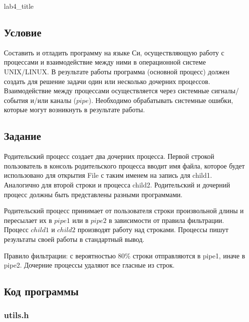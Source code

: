 \documentclass[12pt]{article}
\begin{document}
	
	{lab4_title}
	
	\subsection*{Условие}
	
	Составить и отладить программу на языке Си, осуществляющую работу с процессами и
	взаимодействие между ними в операционной системе UNIX/LINUX. В результате работы
	программа (основной процесс) должен создать для решение задачи один или несколько
	дочерних процессов. Взаимодействие между процессами осуществляется через системные
	сигналы/события и/или каналы ($pipe$).
	Необходимо обрабатывать системные ошибки, которые могут возникнуть в результате работы.
	
	\subsection*{Задание}
	
	Родительский процесс создает два дочерних процесса. Первой строкой пользователь в консоль
	родительского процесса вводит имя файла, которое будет использовано для открытия File с таким
	именем на запись для child1. Аналогично для второй строки и процесса child2. Родительский и
	дочерний процесс должны быть представлены разными программами.
	
	\par 
	
	Родительский процесс принимает от пользователя строки произвольной длины и пересылает их в
	$pipe1$ или в $pipe2$ в зависимости от правила фильтрации. Процесс $child1$ и $child2$ производят работу
	над строками. Процессы пишут результаты своей работы в стандартный вывод.
	
	\par 
	
	Правило фильтрации: с вероятностью 80\% строки отправляются в pipe1, иначе в pipe2.
	Дочерние процессы удаляют все гласные из строк.
	
	\subsection*{Код программы}
	
	\subsubsection*{utils.h}
	
	
	
\end{document}
